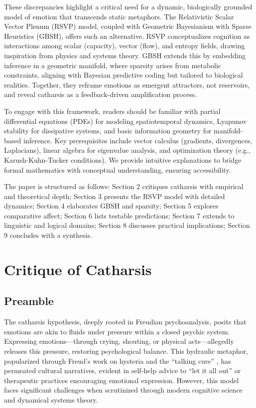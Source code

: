 \documentclass[11pt]{article}
\theoremstyle{plain}
\begin{document}
These discrepancies highlight a critical need for a dynamic, biologically grounded model of emotion that transcends static metaphors. The Relativistic Scalar Vector Plenum (RSVP) model, coupled with Geometric Bayesianism with Sparse Heuristics (GBSH), offers such an alternative. RSVP conceptualizes cognition as interactions among scalar (capacity), vector (flow), and entropy fields, drawing inspiration from physics and systems theory. GBSH extends this by embedding inference in a geometric manifold, where sparsity arises from metabolic constraints, aligning with Bayesian predictive coding but tailored to biological realities. Together, they reframe emotions as emergent attractors, not reservoirs, and reveal catharsis as a feedback-driven amplification process.

To engage with this framework, readers should be familiar with partial differential equations (PDEs) for modeling spatiotemporal dynamics, Lyapunov stability for dissipative systems, and basic information geometry for manifold-based inference. Key prerequisites include vector calculus (gradients, divergences, Laplacians), linear algebra for eigenvalue analysis, and optimization theory (e.g., Karush-Kuhn-Tucker conditions). We provide intuitive explanations to bridge formal mathematics with conceptual understanding, ensuring accessibility.

The paper is structured as follows: Section 2 critiques catharsis with empirical and theoretical depth; Section 3 presents the RSVP model with detailed dynamics; Section 4 elaborates GBSH and sparsity; Section 5 explores comparative affect; Section 6 lists testable predictions; Section 7 extends to linguistic and logical domains; Section 8 discusses practical implications; Section 9 concludes with a synthesis.

\section{Critique of Catharsis}

\subsection{Preamble}
The catharsis hypothesis, deeply rooted in Freudian psychoanalysis, posits that emotions are akin to fluids under pressure within a closed psychic system. Expressing emotions—through crying, shouting, or physical acts—allegedly releases this pressure, restoring psychological balance. This hydraulic metaphor, popularized through Freud’s work on hysteria and the “talking cure” \citep{Douglas1966}, has permeated cultural narratives, evident in self-help advice to “let it all out” or therapeutic practices encouraging emotional expression. However, this model faces significant challenges when scrutinized through modern cognitive science and dynamical systems theory.
\end{document}
